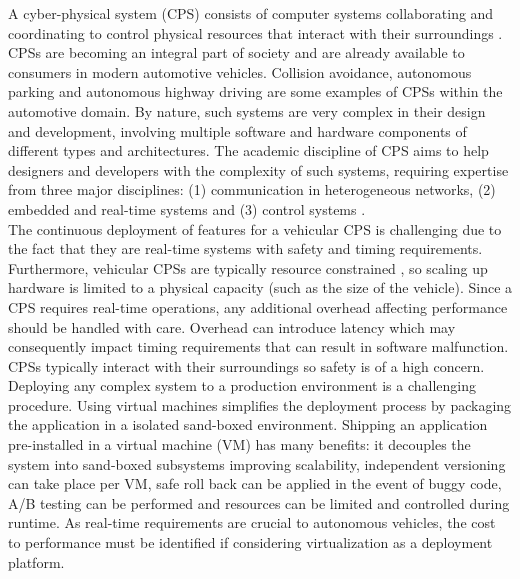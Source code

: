 A cyber-physical system (CPS) consists of computer systems collaborating and coordinating to control physical resources that interact with their surroundings \cite{cps}. CPSs are becoming an integral part of society and are already available to consumers in modern automotive vehicles. Collision avoidance, autonomous parking and autonomous highway driving are some examples of CPSs within the automotive domain. By nature, such systems are very complex in their design and development, involving multiple software and hardware components of different types and architectures. The academic discipline of CPS aims to help designers and developers with the complexity of such systems, requiring expertise from three major disciplines: (1) communication in heterogeneous networks, (2) embedded and real-time systems and (3) control systems \cite{gonz}. \\

The continuous deployment of features for a vehicular CPS is challenging due to the fact that they are real-time systems with safety and timing requirements. Furthermore, vehicular CPSs are typically resource constrained \cite{wan2011advances}, so scaling up hardware is limited to a physical capacity (such as the size of the vehicle). Since a CPS requires real-time operations, any additional overhead affecting performance should be handled with care. Overhead can introduce latency which may consequently impact timing requirements that can result in software malfunction. CPSs typically interact with their surroundings so safety is of a high concern. \\

Deploying any complex system to a production environment is a challenging procedure. Using virtual machines simplifies the deployment process by packaging the application in a isolated sand-boxed environment. Shipping an application pre-installed in a virtual machine (VM) has many benefits: it decouples the system into sand-boxed subsystems improving scalability, independent versioning can take place per VM, safe roll back can be applied in the event of buggy code, A/B testing can be performed and resources can be limited and controlled during runtime. As real-time requirements are crucial to autonomous vehicles, the cost to performance must be identified if considering virtualization as a deployment platform.\\

